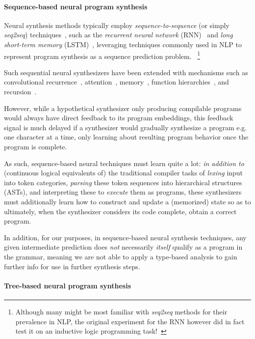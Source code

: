 \documentclass{article}
\begin{document}
\paragraph{Sequence-based neural program synthesis} %

Neural synthesis methods typically employ \emph{sequence-to-sequence}
(or simply \emph{seq2seq}) techniques~\citep{npi,neuralmachinetranslation,alphanpi},
such as the \emph{recurrent neural network} (RNN)~\citep{backproprnn}
and \emph{long short-term memory} (LSTM)~\citep{lstm},
leveraging techniques commonly used in NLP
to represent program synthesis as a sequence prediction problem.%
~\footnote{
    Although many might be most familiar with \emph{seq2seq} methods for their prevalence in NLP,
    the original experiment for the RNN however did in fact test it
    on an inductive logic programming task!~\citep{backproprnn}
}

Such sequential neural synthesizers have been extended with mechanisms such as
convolutional recurrence~\citep{neuralgpu},
attention~\citep{nmt,ptrnets,structuredattention},
memory~\citep{ntm,neuralram,neuralprogrammer,hierarchicalmemory},
function hierarchies~\citep{npi,npl},
and recursion~\citep{cai2017making}.

However, while a hypothetical synthesizer only producing compilable programs would always have direct feedback to its program embeddings,
this feedback signal is much delayed if a synthesizer would gradually synthesize a program e.g. one character at a time,
only learning about resulting program behavior once the program is complete.

As such, sequence-based neural techniques must learn quite a lot:
\emph{in addition to} (continuous logical equivalents of) the traditional compiler tasks of \emph{lexing} input into token categories,
\emph{parsing} these token sequences into hierarchical structures (ASTs),
and interpreting these to \emph{execute} them as programs,
these synthesizers must additionally learn how to construct and update a (memorized) state so as to ultimately,
when the synthesizer considers its code complete, obtain a correct program.

In addition, for our purposes, in sequence-based neural synthesis techniques,
any given intermediate prediction does \emph{not} necessarily \emph{itself} qualify as a program in the grammar,
meaning we are not able to apply a type-based analysis to gain further info for use in further synthesis steps.

\paragraph{Tree-based neural program synthesis}
\end{document}

